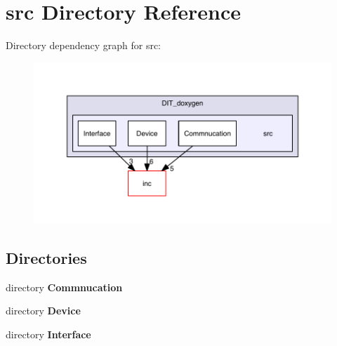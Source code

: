 \section{src Directory Reference}
\label{dir_e423a974556823f5ed416556d6206c00}
Directory dependency graph for src\-:
\nopagebreak
\begin{figure}[H]
\begin{center}
\leavevmode
\includegraphics[width=350pt]{dir_e423a974556823f5ed416556d6206c00_dep}
\end{center}
\end{figure}
\subsection*{Directories}
\begin{DoxyCompactItemize}
\item 
directory {\bf Commnucation}
\item 
directory {\bf Device}
\item 
directory {\bf Interface}
\end{DoxyCompactItemize}
